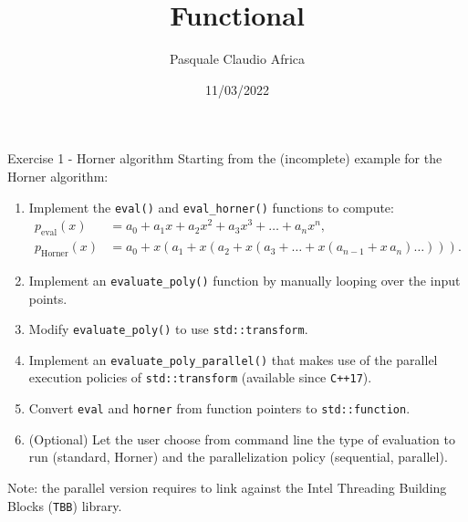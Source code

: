 \documentclass[10pt]{beamer}
\begin{document}
    \title{Functional}
    \author{Pasquale Claudio Africa}
    \date{11/03/2022}
    
\begin{frame}
    \maketitle
\end{frame}

\begin{frame}{Exercise 1 - Horner algorithm}
Starting from the (incomplete) example for the Horner algorithm:
\begin{enumerate}
\item Implement the \texttt{eval()} and \texttt{eval\_horner()} functions to compute:
\begin{align*}
p_\text{eval}(x) &= a_0 + a_1x + a_2x^2 + a_3x^3 + \ldots + a_nx^n, \\
p_\text{Horner}(x) &= a_0 + x \left(a_1 + x \left(a_2 + x \left(a_3 + \ldots + x\left(a_{n-1} + x \, a_n\right) \ldots \right) \right) \right).
\end{align*}
\item Implement an \texttt{evaluate\_poly()} function by manually looping over the input points.
\item Modify \texttt{evaluate\_poly()} to use \texttt{std::transform}.
\item Implement an \texttt{evaluate\_poly\_parallel()} that makes use of the parallel execution policies of \texttt{std::transform} (available since \texttt{C++17}).
\item Convert \texttt{eval} and \texttt{horner} from function pointers to \texttt{std::function}.
\item (Optional) Let the user choose from command line the type of evaluation to run (standard, Horner) and the parallelization policy (sequential, parallel).
\end{enumerate}

Note: the parallel version requires to link against the Intel Threading Building Blocks (\texttt{TBB}) library.
\end{frame}
\end{document}
